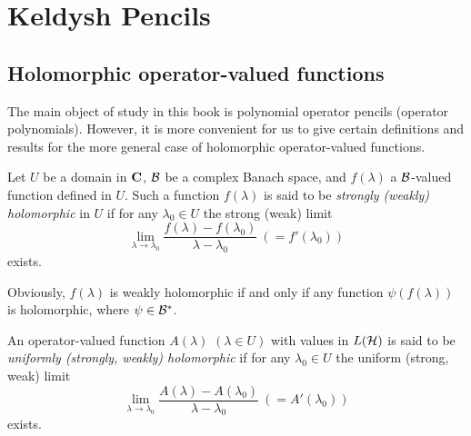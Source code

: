\chapter{Keldysh Pencils}
\section{Holomorphic operator-valued functions}

The main object of study in this book is polynomial operator pencils
(operator polynomials). However, it is more convenient for us to give
certain definitions and results for the more general case of
holomorphic operator-valued functions.

Let $U$ be a domain in $\bold C$, $\cal{B}$ be a complex Banach space,
and $f(\lambda)$ a $\cal{B}$-valued function defined in $U$. Such a
function $f(\lambda)$ is said to be {\it strongly \rom(weakly\rom)
holomorphic} in $U$ if for any $\lambda_0\in U$ the strong (weak)
limit
\begin{equation}
\lim_{\lambda\to\lambda_0}\frac{f(\lambda)-f(\lambda_0)}{\lambda-\lambda_0}\
(=f'(\lambda_0))
\end{equation}
exists.

Obviously,  $f(\lambda)$ is weakly holomorphic if and only if any function
$\psi(f(\lambda))$ is holomorphic, where $\psi\in\cal{B}^*$.

An operator-valued function $A(\lambda)$ $(\lambda\in U)$ with values in
$L(\cal H)$ is said to be {\it uniformly \rom(strongly, weakly\rom) holomorphic}
 if for any $\lambda_0\in U$ the uniform (strong, weak) limit
\begin{equation}
\lim_{\lambda\to\lambda_0}\frac{A(\lambda)-A(\lambda_0)}{\lambda-\lambda_0}
\ (=A'(\lambda_0))
\end{equation}
exists.

\endinput
